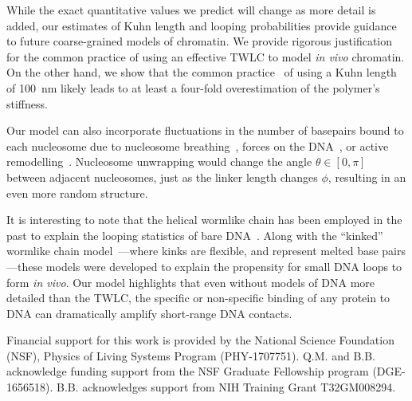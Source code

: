 \documentclass[%
 reprint,
superscriptaddress,
showpacs,preprintnumbers,
 amsmath,amssymb,
 aps,
 prl,
]{revtex4-1}
\begin{document}
While the exact quantitative values we predict will change as more detail is
    added, our estimates of Kuhn length and looping probabilities provide
    guidance to future coarse-grained models of chromatin.
We provide rigorous justification for the common practice of using an effective
    TWLC to model \textit{in vivo} chromatin.
On the other hand, we show that the common practice~\cite{macphersonInPress,nuebler2018}
    of using a Kuhn length of \SI{100}{\nano\metre} likely leads to at least a
    four-fold overestimation of the polymer's stiffness.

Our model can also incorporate fluctuations in the number of basepairs bound to
    each nucleosome due to nucleosome
    breathing~\cite{TODO}, forces on the DNA~\cite{TODO}, or active
    remodelling~\cite{dion2007,kulaeva2007,senavirathne2017}.
Nucleosome unwrapping would change the angle $\theta \in [0, \pi]$
    between adjacent nucleosomes, just as the linker length changes
    $\phi$, resulting in an even more random structure.

It is interesting to note that the helical wormlike chain has been employed
    in the past to explain the looping statistics of bare DNA~\cite{shimada1984,
    liu2011a}.
Along with the ``kinked'' wormlike chain model~\cite{wiggins2005,
    popov2005}---where kinks are flexible, and represent melted base
    pairs---these models were developed to explain the propensity for small DNA
    loops to form \textit{in vivo}.
Our model highlights that even without models of DNA more detailed than the
    TWLC, the specific or non-specific binding of any protein to DNA can
    dramatically amplify short-range DNA contacts.\@

\begin{acknowledgements}
Financial support for this work is provided by the National Science Foundation
    (NSF), Physics of Living Systems Program (PHY-1707751). Q.M. and B.B.
    acknowledge funding support from the NSF Graduate Fellowship program
    (DGE-1656518). B.B. acknowledges support from NIH Training Grant
    T32GM008294.
\end{acknowledgements}


\end{document}
